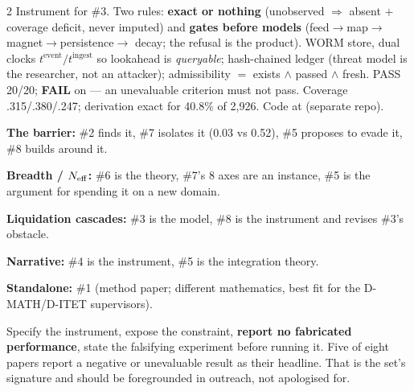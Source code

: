 \documentclass[10pt,a4paper]{article}
\begin{document}
\begin{multicols}{2}
Instrument for \#3. Two rules: \textbf{exact or nothing} (unobserved $\Rightarrow$ absent + coverage
deficit, never imputed) and \textbf{gates before models} (feed$\to$map$\to$magnet$\to$persistence$\to$
decay; the refusal is the product). WORM store, dual clocks $t^{\mathrm{event}}/t^{\mathrm{ingest}}$ so
lookahead is \emph{queryable}; hash-chained ledger (threat model is the researcher, not an attacker);
admissibility $=$ exists $\wedge$ passed $\wedge$ fresh.  PASS 20/20; \textbf{ FAIL} on  — an unevaluable criterion must not pass. Coverage .315/.380/.247;
derivation exact for 40.8\% of 2,926. Code at  (separate repo).

\begin{opitems}
\item \textbf{The barrier:} \#2 finds it, \#7 isolates it (0.03 vs 0.52), \#5 proposes to evade it, \#8
      builds around it.
\item \textbf{Breadth / $N_{\mathrm{eff}}$:} \#6 is the theory, \#7's 8 axes are an instance, \#5 is the argument
      for spending it on a new domain.
\item \textbf{Liquidation cascades:} \#3 is the model, \#8 is the instrument and revises \#3's obstacle.
\item \textbf{Narrative:} \#4 is the instrument, \#5 is the integration theory.
\item \textbf{Standalone:} \#1 (method paper; different mathematics, best fit for the D-MATH/D-ITET
      supervisors).
\end{opitems}

Specify the instrument, expose the constraint, \textbf{report no fabricated performance}, state the
falsifying experiment before running it. Five of eight papers report a negative or unevaluable result as
their headline. That is the set's signature and should be foregrounded in outreach, not apologised for.


\end{multicols}
\end{document}
